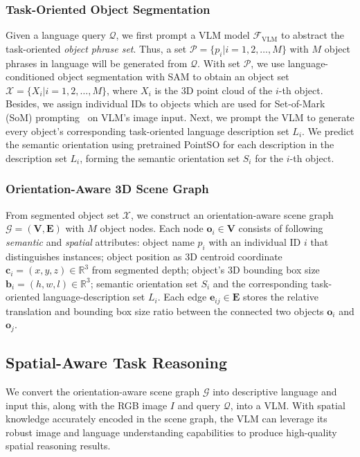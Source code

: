 \subsubsection{Task-Oriented Object Segmentation}
Given a language query $\mathcal{Q}$, we first prompt a VLM model $\mathcal{F}_{\text{VLM}}$ to abstract the task-oriented \textit{object phrase set}.
Thus, a set $\mathcal{P} = \{p_i|i=1,2,\dots,M\}$ with $M$ object phrases in language will be generated from $\mathcal{Q}$.
With set $\mathcal{P}$, we use language-conditioned object segmentation with SAM to obtain an object set $\mathcal{X} = \{X_i|i=1,2,\dots, M\}$, where $X_i$ is the 3D point cloud of the $i$-th object.
Besides, we assign individual IDs to objects which are used for Set-of-Mark (SoM) prompting~\cite{SoM23} on VLM's image input.
Next, we prompt the VLM to generate every object's corresponding task-oriented language description set $L_i$. We predict the semantic orientation using pretrained PointSO for each description in the description set $L_i$, forming the semantic orientation set $S_i$ for the $i$-th object.


\subsubsection{Orientation-Aware 3D Scene Graph}
From segmented object set $\mathcal{X}$, we construct an orientation-aware scene graph $\mathcal{G}=(\mathbf{V},\mathbf{E})$ with $M$ object nodes.
Each node $\mathbf{o}_i \in \mathbf{V}$ consists of following \textit{semantic} and \textit{spatial} attributes:
 object name $p_i$ with an individual ID $i$ that distinguishes instances;
 object position as 3D centroid coordinate $\mathbf{c}_i =(x,y,z)\in \mathbb{R}^3$ from segmented depth;
 object's 3D bounding box size $\mathbf{b}_i=(h,w,l)\in \mathbb{R}^3$;
 semantic orientation set $S_i$ and the corresponding task-oriented language-description set $L_i$.
Each edge $\mathbf{e}_{ij}\in\mathbf{E}$ stores the relative translation and bounding box size ratio between the connected two objects $\mathbf{o}_i$ and $\mathbf{o}_j$.

\subsection{Spatial-Aware Task Reasoning}\label{sec:manip_pipline}
We convert the orientation-aware scene graph $\mathcal{G}$ into descriptive language and input this, along with the RGB image $I$ and query $\mathcal{Q}$, into a VLM. With spatial knowledge accurately encoded in the scene graph, the VLM can leverage its robust image and language understanding capabilities to produce high-quality spatial reasoning results.

